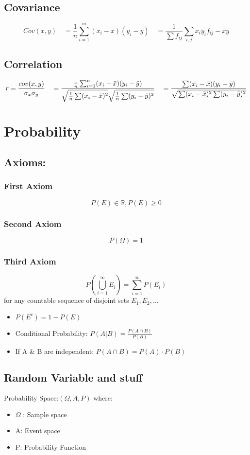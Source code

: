 \documentclass[12pt]{article}
\begin{document}
\subsection{Covariance}
\[Cov(x,y) \quad 
= \frac{1}{n} \sum_{i=1}^{m}(x_i-\bar{x})(y_i-\bar{y}) \quad 
= \frac{1}{\sum f_{ij}} \sum_{i,j} x_i y_i f_{ij} -\bar{x}\bar{y}
\]

\subsection{Correlation}
\[r = \frac{cov(x,y)}{\sigma_x \sigma_y} \quad
= \frac{\frac{1}{n} \sum_{i=1}^{n}(x_i-\bar{x})(y_i-\bar{y})} %
{ \sqrt{\frac{1}{n}\sum(x_i - \Bar{x})^2} \sqrt{\frac{1}{n}\sum(y_i -\Bar{y})^2} } \quad %
= \frac{\sum(x_i-\Bar{x})(y_i - \Bar{y})} {\sqrt{\sum(x_i-\Bar{x})^2\sum(y_i-\Bar{y})^2}}
\]

\section{Probability}

\subsection{Axioms:}
\subsubsection{First Axiom}
\[ P(E) \in \mathbb{R}, P(E) \geq0 \]
\subsubsection{Second Axiom}
\[ P(\Omega)=1\]
\subsubsection{Third Axiom}
\[ P\left( \bigcup_{i=1}^{\infty}E_i \right) = \sum_{i=1}^{\infty} P(E_i)\]
\null\hfill for any countable sequence of disjoint sets $E_{1},E_{2},\ldots$

\begin{itemize}
\item $ P(E^c) = 1-P(E) $
\item Conditional Probability: $P(A|B)= \frac{P(A \cap B)}{P(B)}$
\item If A \& B are independent: $P(A\cap B) = P(A) \cdot P(B)$
\end{itemize}


\subsection{Random Variable and stuff}
Probability Space:\quad $(\Omega , A, P)$ \quad
where: 
\begin{itemize}
    \item $\Omega$ : Sample space
    \item A: Event space
    \item P: Probability Function
\end{itemize}
\end{document}
